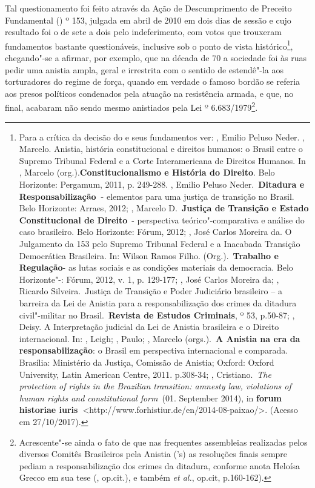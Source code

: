 Tal questionamento foi feito através da Ação de Descumprimento de
Preceito Fundamental () º 153, julgada em abril de 2010 em dois
dias de sessão e cujo resultado foi o de sete a dois pelo indeferimento,
com votos que trouxeram fundamentos bastante questionáveis, inclusive
sob o ponto de vista histórico\footnote{Para a crítica da decisão do 
  e seus fundamentos ver: , Emilio Peluso Neder. , Marcelo.
  Anistia, história constitucional e direitos humanos: o Brasil entre o
  Supremo Tribunal Federal e a Corte Interamericana de Direitos Humanos.
  In , Marcelo (org.).\textbf{Constitucionalismo e História do
  Direito}. Belo Horizonte: Pergamum, 2011, p. 249-288. , Emilio
  Peluso Neder.~\textbf{Ditadura e Responsabilização~}- elementos para
  uma justiça de transição no Brasil. Belo Horizonte: Arraes, 2012;
  , Marcelo D.~\textbf{Justiça de Transição e Estado
  Constitucional de Direito}~- perspectiva teórico"-comparativa e análise
  do caso brasileiro. Belo Horizonte: Fórum, 2012;  , José
  Carlos Moreira da. O Julgamento da  153 pelo Supremo Tribunal
  Federal e a Inacabada Transição Democrática Brasileira. In: Wilson
  Ramos Filho. (Org.).~\textbf{Trabalho e Regulação}- as lutas sociais e
  as condições materiais da democracia. Belo Horizonte"-: Fórum, 2012,
  v. 1, p. 129-177;  , José Carlos Moreira da; , Ricardo
  Silveira.~Justiça de Transição e Poder Judiciário brasileiro -- a
  barreira da Lei de Anistia para a responsabilização dos crimes da
  ditadura civil"-militar no Brasil.~\textbf{Revista de Estudos
  Criminais}, º 53, p.50-87; , Deisy. A Interpretação judicial da
  Lei de Anistia brasileira e o Direito internacional. In: , Leigh;
  , Paulo; , Marcelo (orgs.).~\textbf{A Anistia na era da
  responsabilização}: o Brasil em perspectiva internacional e comparada.
  Brasília: Ministério da Justiça, Comissão de Anistia; Oxford: Oxford
  University, Latin American Centre, 2011. p.308-34; ,
  Cristiano.~\emph{The protection of rights in the Brazilian transition:
  amnesty law, violations of human rights and constitutional form}~(01.
  September 2014), in \textbf{forum historiae
  iuris~}\textless{}http://www.forhistiur.de/en/2014-08-paixao/\textgreater{}.
  (Acesso em 27/10/2017).}, chegando"-se a afirmar, por exemplo, que na
década de 70 a sociedade foi às ruas pedir uma anistia ampla, geral e
irrestrita com o sentido de estendê"-la aos torturadores do regime de
força, quando em verdade o famoso bordão se referia aos presos políticos
condenados pela atuação na resistência armada, e que, no final, acabaram
não sendo mesmo anistiados pela Lei º 6.683/1979\footnote{Acrescente"-se
  ainda o fato de que nas frequentes assembleias realizadas pelos
  diversos Comitês Brasileiros pela Anistia ('s) as resoluções finais
  sempre pediam a responsabilização dos crimes da ditadura, conforme
  anota Heloísa Grecco em sua tese (, op.cit.), e também 
  \emph{et al.}, op.cit, p.160-162).}.

